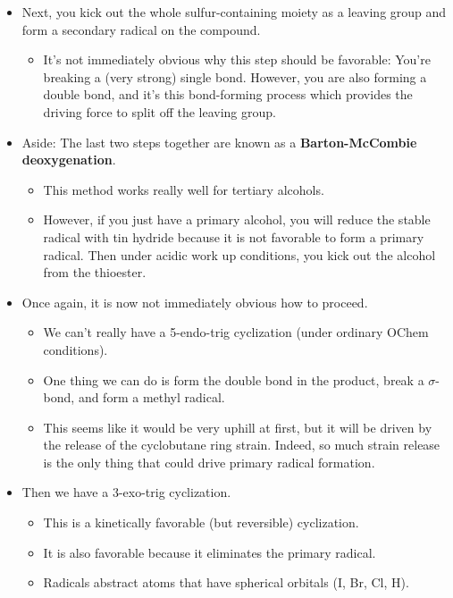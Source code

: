 \documentclass[../notes.tex]{subfiles}
\begin{document}
\begin{itemize}
\begin{itemize}
    \end{itemize}
    \item Next, you kick out the whole sulfur-containing moiety as a leaving group and form a secondary radical on the compound.
    \begin{itemize}
        \item It's not immediately obvious why this step should be favorable: You're breaking a (very strong)  single bond. However, you are also forming a  double bond, and it's this bond-forming process which provides the driving force to split off the leaving group.
    \end{itemize}
    \item Aside: The last two steps together are known as a \textbf{Barton-McCombie deoxygenation}.
    \begin{itemize}
        \item This method works really well for tertiary alcohols.
        \item However, if you just have a primary alcohol, you will reduce the stable radical with tin hydride because it is not favorable to form a primary radical. Then under acidic work up conditions, you kick out the alcohol from the thioester.
    \end{itemize}
    \item Once again, it is now not immediately obvious how to proceed.
    \begin{itemize}
        \item We can't really have a 5-endo-trig cyclization (under ordinary OChem conditions).
        \item One thing we can do is form the double bond in the product, break a  $\sigma$-bond, and form a methyl radical.
        \item This seems like it would be very uphill at first, but it will be driven by the release of the cyclobutane ring strain. Indeed, so much strain release is the only thing that could drive primary radical formation.
    \end{itemize}
    \item Then we have a 3-exo-trig cyclization.
    \begin{itemize}
        \item This is a kinetically favorable (but reversible) cyclization.
        \item It is also favorable because it eliminates the primary radical.
        \item Radicals abstract atoms that have spherical orbitals (I, Br, Cl, H).

\end{itemize}
\end{itemize}
\end{document}
